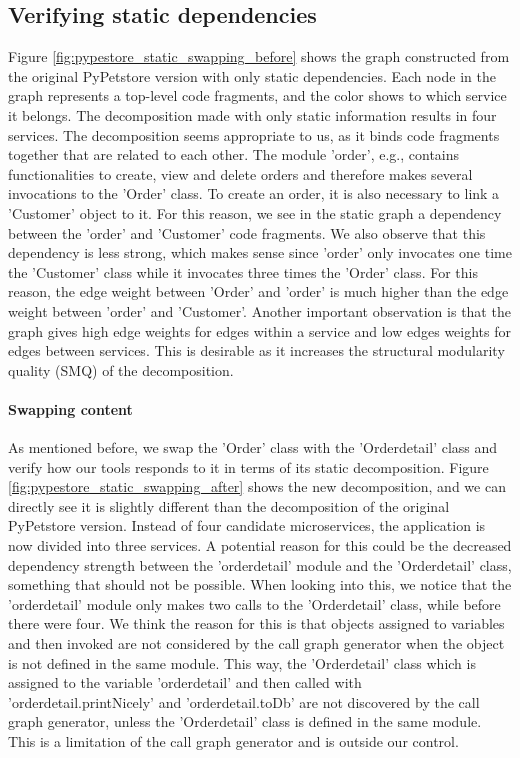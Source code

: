 \subsection{Verifying static dependencies}
Figure \ref{fig:pypestore_static_swapping_before} shows the graph constructed from the original PyPetstore version with only static dependencies. Each node in the graph represents a top-level code fragments, and the color shows to which service it belongs. The decomposition made with only static information results in four services. The decomposition seems appropriate to us, as it binds code fragments together that are related to each other. The module 'order', e.g., contains functionalities to create, view and delete orders and therefore makes several invocations to the 'Order' class. To create an order, it is also necessary to link a 'Customer' object to it. For this reason, we see in the static graph a dependency between the 'order' and 'Customer' code fragments. We also observe that this dependency is less strong, which makes sense since 'order' only invocates one time the 'Customer' class while it invocates three times the 'Order' class. For this reason, the edge weight between 'Order' and 'order' is much higher than the edge weight between 'order' and 'Customer'. Another important observation is that the graph gives high edge weights for edges within a service and low edges weights for edges between services. This is desirable as it increases the structural modularity quality (SMQ) of the decomposition.

\paragraph{Swapping content}
As mentioned before, we swap the 'Order' class with the 'Orderdetail' class and verify how our tools responds to it in terms of its static decomposition. Figure \ref{fig:pypestore_static_swapping_after} shows the new decomposition, and we can directly see it is slightly different than the decomposition of the original PyPetstore version. Instead of four candidate microservices, the application is now divided into three services. A potential reason for this could be the decreased dependency strength between the 'orderdetail' module and the 'Orderdetail' class, something that should not be possible. When looking into this, we notice that the 'orderdetail' module only makes two calls to the 'Orderdetail' class, while before there were four. We think the reason for this is that objects assigned to variables and then invoked are not considered by the call graph generator when the object is not defined in the same module. This way, the 'Orderdetail' class which is assigned to the variable 'orderdetail' and then called with 'orderdetail.printNicely' and 'orderdetail.toDb' are not discovered by the call graph generator, unless the 'Orderdetail' class is defined in the same module. This is a limitation of the call graph generator and is outside our control.\par

